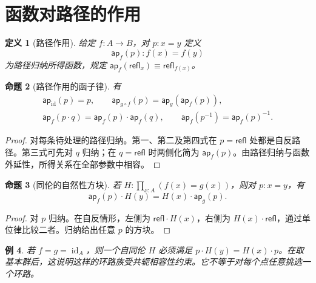 \documentclass[12pt,oneside,openany,fontset=none]{ctexbook}
\theoremstyle{cn}
\newtheorem{definition}{定义}[chapter]
\newtheorem{example}[definition]{例}
\newtheorem{proposition}[definition]{命题}
\numberwithin{equation}{chapter}
\newcommand{\id}{\operatorname{id}}
\newcommand{\refl}{\mathsf{refl}}
\newcommand{\ap}{\mathsf{ap}}
\begin{document}
\section{函数对路径的作用}
\begin{definition}[路径作用]
给定 $f:A\to B$，对 $p:x=y$ 定义
\[
\ap_f(p):f(x)=f(y)
\]
为路径归纳所得函数，规定 $\ap_f(\refl_x)\equiv\refl_{f(x)}$。
\end{definition}
\begin{proposition}[路径作用的函子律]
有
\begin{gather*}
\ap_{\id}(p)=p,
\qquad\ap_{g\circ f}(p)=\ap_g(\ap_f(p)),\\
\ap_f(p\cdot q)=\ap_f(p)\cdot\ap_f(q),
\qquad\ap_f(p^{-1})=\ap_f(p)^{-1}.
\end{gather*}
\end{proposition}
\begin{proof}
对每条待处理的路径归纳。第一、第二及第四式在 $p=\refl$ 处都是自反路径。第三式可先对 $q$ 归纳；在 $q=\refl$ 时两侧化简为 $\ap_f(p)$。由路径归纳与函数外延性，所得关系在全部参数中相容。
\end{proof}
\begin{proposition}[同伦的自然性方块]\label{prop:homotopy-naturality}
若 $H:\prod_{x:A}(f(x)=g(x))$，则对 $p:x=y$，有
\[
\ap_f(p)\cdot H(y)=H(x)\cdot\ap_g(p).
\]
\end{proposition}
\begin{proof}
对 $p$ 归纳。在自反情形，左侧为 $\refl\cdot H(x)$，右侧为 $H(x)\cdot\refl$，通过单位律比较二者。归纳给出任意 $p$ 的方块。
\end{proof}
\begin{example}
若 $f=g=\id_A$，则一个自同伦 $H$ 必须满足 $p\cdot H(y)=H(x)\cdot p$。在取基本群后，这说明这样的环路族受共轭相容性约束。它不等于对每个点任意挑选一个环路。
\end{example}
\end{document}
